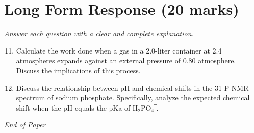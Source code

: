 \documentclass[12pt]{article}
\begin{document}
\section*{Long Form Response (20 marks)}
\textit{Answer each question with a clear and complete explanation.}
\begin{enumerate}[label=\arabic*.]
\setcounter{enumi}{10}
\item Calculate the work done when a gas in a 2.0-liter container at 2.4 atmospheres expands against an external pressure of 0.80 atmosphere. Discuss the implications of this process.
\item Discuss the relationship between pH and chemical shifts in the 31 P NMR spectrum of sodium phosphate. Specifically, analyze the expected chemical shift when the pH equals the pKa of H$_{2}$PO$_{4}$‾.
\end{enumerate}

\vfill
\noindent\textit{End of Paper}
\end{document}
